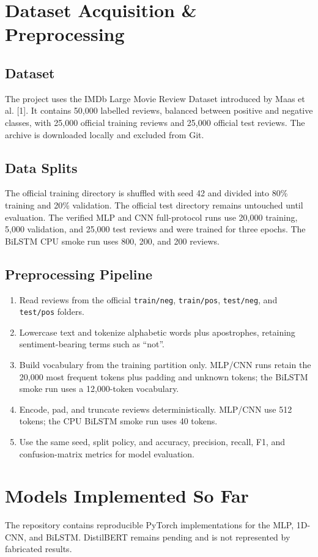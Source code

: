 \documentclass[10pt,a4paper]{article}
\begin{document}
\section{Dataset Acquisition \& Preprocessing}
\subsection*{Dataset}
The project uses the IMDb Large Movie Review Dataset introduced by Maas et al. [1]. It contains 50,000 labelled reviews, balanced between positive and negative classes, with 25,000 official training reviews and 25,000 official test reviews. The archive is downloaded locally and excluded from Git.

\subsection*{Data Splits}
The official training directory is shuffled with seed 42 and divided into 80\% training and 20\% validation. The official test directory remains untouched until evaluation. The verified MLP and CNN full-protocol runs use 20,000 training, 5,000 validation, and 25,000 test reviews and were trained for three epochs. The BiLSTM CPU smoke run uses 800, 200, and 200 reviews.

\subsection*{Preprocessing Pipeline}
\begin{enumerate}[nosep]
\item Read reviews from the official \texttt{train/neg}, \texttt{train/pos}, \texttt{test/neg}, and \texttt{test/pos} folders.
\item Lowercase text and tokenize alphabetic words plus apostrophes, retaining sentiment-bearing terms such as ``not''.
\item Build vocabulary from the training partition only. MLP/CNN runs retain the 20,000 most frequent tokens plus padding and unknown tokens; the BiLSTM smoke run uses a 12,000-token vocabulary.
\item Encode, pad, and truncate reviews deterministically. MLP/CNN use 512 tokens; the CPU BiLSTM smoke run uses 40 tokens.
\item Use the same seed, split policy, and accuracy, precision, recall, F1, and confusion-matrix metrics for model evaluation.
\end{enumerate}

\section{Models Implemented So Far}
The repository contains reproducible PyTorch implementations for the MLP, 1D-CNN, and BiLSTM. DistilBERT remains pending and is not represented by fabricated results.
\end{document}
